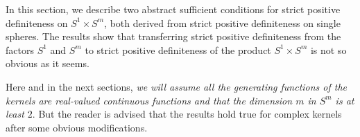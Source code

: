 In this section, we describe two abstract suf\/f\/icient conditions for strict positive def\/initeness on $S^1 \times S^m$, both derived from strict positive def\/initeness on single spheres. The results show that transferring strict positive def\/initeness from the factors $S^1$ and $S^m$ to strict positive def\/initeness of the product $S^1 \times S^m$ is not so obvious as it seems.

Here and in the next sections, {\em we will assume all the generating functions of the kernels are real-valued continuous functions and that the dimension $m$ in $S^m$ is at least $2$}. But the reader is advised that the results hold true for complex kernels after some obvious modif\/ications.
